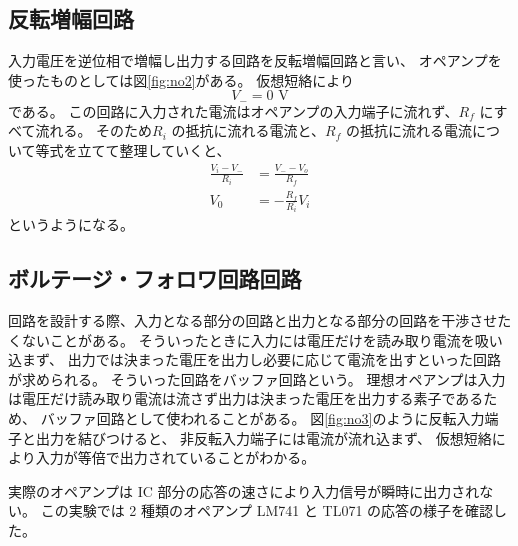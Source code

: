 \documentclass[11pt,dvipdfmx,a4paper]{jsarticle}
\begin{document}
\subsection{反転増幅回路}
入力電圧を逆位相で増幅し出力する回路を反転増幅回路と言い、
オペアンプを使ったものとしては図\ref{fig:no2}がある。
仮想短絡により
\begin{equation}
	V_{-} = 0 \text{ V}
\end{equation}
である。
この回路に入力された電流はオペアンプの入力端子に流れず、\(R_{f}\) にすべて流れる。
そのため\(R_i\) の抵抗に流れる電流と、\(R_f\) の抵抗に流れる電流について等式を立てて整理していくと、
\begin{align}
	\frac{V_i-V_{-}}{R_i} &= \frac{V_{-}-V_o}{R_f}\\
	V_0 &= -\frac{R_f}{R_i} V_i
\end{align}
というようになる。

\subsection{ボルテージ・フォロワ回路回路}
回路を設計する際、入力となる部分の回路と出力となる部分の回路を干渉させたくないことがある。
そういったときに入力には電圧だけを読み取り電流を吸い込まず、
出力では決まった電圧を出力し必要に応じて電流を出すといった回路が求められる。
そういった回路をバッファ回路という。
理想オペアンプは入力は電圧だけ読み取り電流は流さず出力は決まった電圧を出力する素子であるため、
バッファ回路として使われることがある。
図\ref{fig:no3}のように反転入力端子と出力を結びつけると、
非反転入力端子には電流が流れ込まず、
仮想短絡により入力が等倍で出力されていることがわかる。

実際のオペアンプは IC 部分の応答の速さにより入力信号が瞬時に出力されない。
この実験では 2 種類のオペアンプ LM741 と TL071 の応答の様子を確認した。
\end{document}
